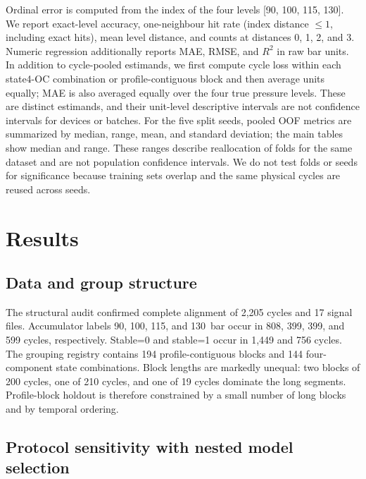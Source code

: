 \documentclass[11pt,a4paper]{article}
\begin{document}
Ordinal error is computed from the index of the four levels [90, 100, 115, 130]. We report exact-level accuracy, one-neighbour hit rate (index distance $\leq 1$, including exact hits), mean level distance, and counts at distances 0, 1, 2, and 3. Numeric regression additionally reports MAE, RMSE, and $R^2$ in raw bar units. In addition to cycle-pooled estimands, we first compute cycle loss within each state4-OC combination or profile-contiguous block and then average units equally; MAE is also averaged equally over the four true pressure levels. These are distinct estimands, and their unit-level descriptive intervals are not confidence intervals for devices or batches. For the five split seeds, pooled OOF metrics are summarized by median, range, mean, and standard deviation; the main tables show median and range. These ranges describe reallocation of folds for the same dataset and are not population confidence intervals. We do not test folds or seeds for significance because training sets overlap and the same physical cycles are reused across seeds.

\section{Results}

\subsection{Data and group structure}

The structural audit confirmed complete alignment of 2,205 cycles and 17 signal files. Accumulator labels 90, 100, 115, and 130~bar occur in 808, 399, 399, and 599 cycles, respectively. Stable=0 and stable=1 occur in 1,449 and 756 cycles. The grouping registry contains 194 profile-contiguous blocks and 144 four-component state combinations. Block lengths are markedly unequal: two blocks of 200 cycles, one of 210 cycles, and one of 19 cycles dominate the long segments. Profile-block holdout is therefore constrained by a small number of long blocks and by temporal ordering.

\subsection{Protocol sensitivity with nested model selection}
\end{document}
